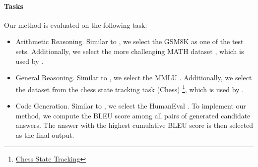 



\paragraph{Tasks} 

Our method is evaluated on the following task:
\begin{itemize}
    \item Arithmetic Reasoning. Similar to \citet{cotsc,complexity-cot,debate}, we select the GSM8K \cite{gsm} as one of the test sets. Additionally, we select the more challenging MATH dataset \cite{math}, which is used by \citet{autogen}.
    \item General Reasoning. Similar to \citet{debate,llm-blender}, we select the MMLU \cite{mmlu}. Additionally, we select the dataset from the chess state tracking task (Chess) \footnote{\href{https://github.com/google/BIG-bench/blob/main/bigbench/benchmark_tasks/chess_state_tracking/synthetic_short/task.json}{Chess State Tracking}}, which is used by \citet{debate,som}. 
    \item Code Generation. Similar to \citet{dylan}, we select the HumanEval \cite{humaneval}. To implement our method, we compute the BLEU score \cite{bleu} among all pairs of generated candidate answers. The answer with the highest cumulative BLEU score is then selected as the final output.
\end{itemize}

